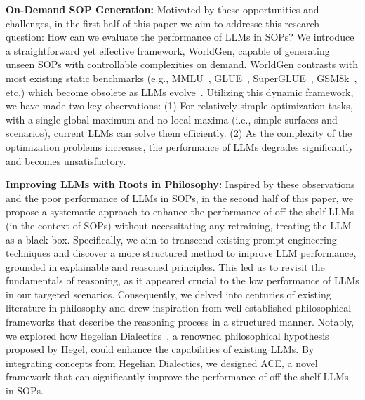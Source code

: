 \textbf{On-Demand SOP Generation:}
Motivated by these opportunities and challenges, in the first half of this paper we aim to addresse this research question: How can we evaluate the performance of LLMs in SOPs? We introduce a straightforward yet effective framework, WorldGen, capable of generating unseen SOPs with controllable complexities on demand. WorldGen contrasts with most existing static benchmarks (e.g., MMLU~\cite{mmlu}, GLUE~\cite{wang2018glue}, SuperGLUE~\cite{wang2019superglue}, GSM8k~\cite{gsm8k}, etc.) which become obsolete as LLMs evolve~\cite{gaia}. Utilizing this dynamic framework, we have made two key observations: (1) For relatively simple optimization tasks, with a single global maximum and no local maxima (i.e., simple surfaces and scenarios), current LLMs can solve them efficiently. (2) As the complexity of the optimization problems increases, the performance of LLMs degrades significantly and becomes unsatisfactory.

\textbf{Improving LLMs with Roots in Philosophy:}
Inspired by these observations and the poor performance of LLMs in SOPs, in the second half of this paper, we propose a systematic approach to enhance the performance of off-the-shelf LLMs (in the context of SOPs) without necessitating any retraining, treating the LLM as a black box. Specifically, we aim to transcend existing prompt engineering techniques and discover a more structured method to improve LLM performance, grounded in explainable and reasoned principles. This led us to revisit the fundamentals of reasoning, as it appeared crucial to the low performance of LLMs in our targeted scenarios. Consequently, we delved into centuries of existing literature in philosophy and drew inspiration from well-established philosophical frameworks that describe the reasoning process in a structured manner. Notably, we explored how Hegelian Dialectics~\cite{hegel_science_logic}, a renowned philosophical hypothesis proposed by Hegel, could enhance the capabilities of existing LLMs. By integrating concepts from Hegelian Dialectics, we designed ACE, a novel framework that can significantly improve the performance of off-the-shelf LLMs in SOPs.

